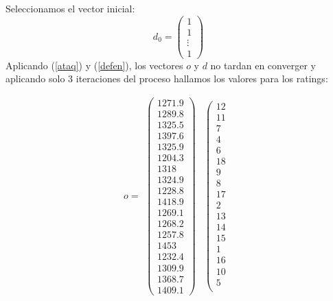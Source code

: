 	Seleccionamos el vector inicial:
	\begin{equation*}
		d_{0} = 
		\left( \begin{array}{c}
			1\\
			1\\
			\vdots\\
			1
		\end{array}\right) 
	\end{equation*}
	Aplicando (\ref{ataq}) y (\ref{defen}), los vectores $o$ y $d$ no tardan en converger y aplicando solo 3 iteraciones del proceso hallamos los valores para los ratings:
	
	\[o=
	\begin{array}{ccc}
	\left(\begin{array}{c}
				1271.9\\
				1289.8\\
				1325.5\\
				1397.6\\
				1325.9\\
				1204.3\\
				1318\\
				1324.9\\
				1228.8\\
				1418.9\\
				1269.1\\
				1268.2\\
				1257.8\\
				1453\\
				1232.4\\
				1309.9\\
				1368.7\\
				1409.1
	\end{array} \right) & \left(\begin{array}{c}
				12\\
				11\\
				7\\
				4\\
				6\\
				18\\
				9\\
				8\\
				17\\
				2\\
				13\\
				14\\
				15\\
				1\\
				16\\
				10\\
				5\\

\end{array}
\end{array}\]
